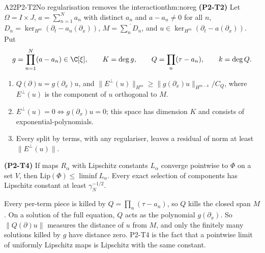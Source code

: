 \begin{dimcard}{A22}{P2-T2}{No regularisation removes the interaction}{\proved}{thm:noreg}
\label{dim:P2-T4}%
\textbf{(P2-T2)} Let $\Omega=I\times J$, $a=\sum_{n=1}^Na_n$ with distinct $a_n$ and $a-a_n\ne0$ for all $n$, $D_n=\ker_{H^m}(\partial_t-a_n(\partial_x))$, $M=\overline{\sum_nD_n}$, and $u\in\ker_{H^m}(\partial_t-a(\partial_x))$. Put
\[
g=\prod_{n=1}^N(a-a_n)\in\C[\xi],\qquad K=\deg g,\qquad Q=\prod_n(\tau-a_n),\qquad k=\deg Q .
\]
\begin{enumerate}[label=(\alph*)]
\item $Q(\partial)u=g(\partial_x)u$, and $\|E^\perp(u)\|_{H^m}\ge\|g(\partial_x)u\|_{H^{m-k}}/C_Q$, where $E^\perp(u)$ is the component of $u$ orthogonal to $M$.
\item $E^\perp(u)=0\iff g(\partial_x)u=0$; this space has dimension $K$ and consists of exponential-polynomials.
\item Every split by terms, with any regulariser, leaves a residual of norm at least $\|E^\perp(u)\|$.
\end{enumerate}
\textbf{(P2-T4)} If maps $R_\alpha$ with Lipschitz constants $L_\alpha$ converge pointwise to $\Phi$ on a set $V$, then $\mathrm{Lip}(\Phi)\le\liminf L_\alpha$. Every exact selection of components has Lipschitz constant at least $\gamma_N^{-1/2}$.
\end{dimcard}

\begin{proofidea}
Every per-term piece is killed by $Q=\prod_n(\tau-a_n)$, so $Q$ kills the closed span $M$. On a solution of the full equation, $Q$ acts as the polynomial $g(\partial_x)$. So $\|Q(\partial)u\|$ measures the distance of $u$ from $M$, and only the finitely many solutions killed by $g$ have distance zero. P2-T4 is the fact that a pointwise limit of uniformly Lipschitz maps is Lipschitz with the same constant.
\end{proofidea}

